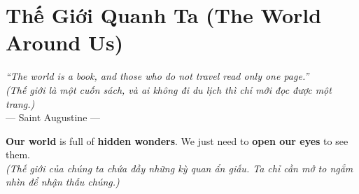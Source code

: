 \chapter{Thế Giới Quanh Ta (The World Around Us)}

\begin{center}
  \textit{\color{truyenblue}``The world is a book, and those who do not travel read only one page.''}\\
  \textit{(Thế giới là một cuốn sách, và ai không đi du lịch thì chỉ mới đọc được một trang.)}\\[4pt]
  \small\color{truyengold}--- Saint Augustine ---
\end{center}

\ngancach

\begin{tcolorbox}[
  colback=truyenred!5, colframe=truyenred!40, arc=6pt,
  title={\bfseries Vẻ Đẹp Muôn Màu (Beautiful Colors)},
  fonttitle=\bfseries\color{truyenred}
]
  \textbf{Our world} is full of \textbf{hidden wonders}. We just need to \textbf{open our eyes} to see them.\\
  \textit{(Thế giới của chúng ta chứa đầy những kỳ quan ẩn giấu. Ta chỉ cần mở to ngắm nhìn để nhận thấu chúng.)}
\end{tcolorbox}

\vspace{0.6cm}

\ngayDay{}
